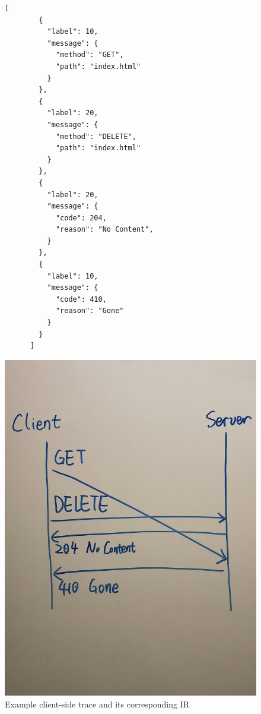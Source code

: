\begin{figure}
  \begin{minipage}{.5\textwidth}
    \begin{lstlisting}[style=json]
      [
        {
          "label": 10,
          "message": {
            "method": "GET",
            "path": "index.html"
          }
        },
        {
          "label": 20,
          "message": {
            "method": "DELETE",
            "path": "index.html"
          }
        },
        {
          "label": 20,
          "message": {
            "code": 204,
            "reason": "No Content",
          }
        },
        {
          "label": 10,
          "message": {
            "code": 410,
            "reason": "Gone"
          }
        }
      ]
    \end{lstlisting}
  \end{minipage}%
  \begin{minipage}{.5\textwidth}
    \includegraphics[width=\textwidth]{figures/trace}
  \end{minipage}
  \caption{Example client-side trace and its corresponding IR}
  \label{fig:trace}
\end{figure}

